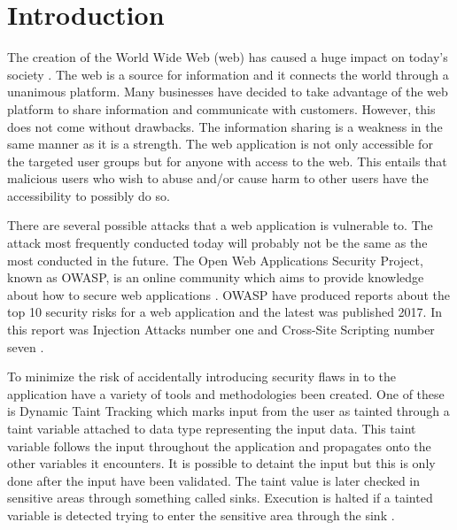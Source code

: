 \chapter{Introduction}
\label{Introduction}
The creation of the World Wide Web (web) has caused a huge impact on today's society \parencite{www}. The web is a source for information and it connects the world through a unanimous platform. Many businesses have decided to take advantage of the web platform to share information and communicate with customers. However, this does not come without drawbacks. The information sharing is a weakness in the same manner as it is a strength. The web application is not only accessible for the targeted user groups but for anyone with access to the web. This entails that malicious users who wish to abuse and/or cause harm to other users have the accessibility to possibly do so.

There are several possible attacks that a web application is vulnerable to. The attack most frequently conducted today will probably not be the same as the most conducted in the future. The Open Web Applications Security Project, known as OWASP, is an online community which aims to provide knowledge about how to secure web applications \parencite{OpenWebApplicationSecurityProject}. OWASP have produced reports about the top 10 security risks for a web application and the latest was published 2017. In this report was Injection Attacks number one and Cross-Site Scripting number seven \parencite{OWASP2017, OpenWebApplicationSecurityProject, CrossMichael2007Dgtw}.

To minimize the risk of accidentally introducing security flaws in to the application have a variety of tools and methodologies been created. One of these is Dynamic Taint Tracking which marks input from the user as tainted through a taint variable attached to data type representing the input data. This taint variable follows the input throughout the application and propagates onto the other variables it encounters. It is possible to detaint the input but this is only done after the input have been validated. The taint value is later checked in sensitive areas through something called sinks. Execution is halted if a tainted variable is detected trying to enter the sensitive area through the sink \parencite{Pan2015, Venkataramani2008}. 


